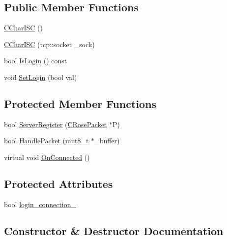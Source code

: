 \subsection*{Public Member Functions}
\begin{DoxyCompactItemize}
\item 
\hyperlink{classCCharISC_ae18a0ff7d066dd5f2d778467e4df78a6}{C\+Char\+I\+SC} ()
\item 
\hyperlink{classCCharISC_a2bfe32cf5c0434bbe4afe3b054c06a97}{C\+Char\+I\+SC} (tcp\+::socket \+\_\+sock)
\item 
bool \hyperlink{classCCharISC_af36d30519afd9ae4d8be42863d1c8160}{Is\+Login} () const 
\item 
void \hyperlink{classCCharISC_a5800f34ef8ddb45225e36806a6aec617}{Set\+Login} (bool val)
\end{DoxyCompactItemize}
\subsection*{Protected Member Functions}
\begin{DoxyCompactItemize}
\item 
bool \hyperlink{classCCharISC_ac6746e044beeedafd54e70758505a1ca}{Server\+Register} (\hyperlink{structCRosePacket}{C\+Rose\+Packet} $\ast$P)
\item 
bool \hyperlink{classCCharISC_a9f039fb39ae52a5794ac1030ea562683}{Handle\+Packet} (\hyperlink{stdint_8h_aba7bc1797add20fe3efdf37ced1182c5}{uint8\+\_\+t} $\ast$\+\_\+buffer)
\item 
virtual void \hyperlink{classCCharISC_ab90f705e4c92b4c7d5f2094b16a0b6d2}{On\+Connected} ()
\end{DoxyCompactItemize}
\subsection*{Protected Attributes}
\begin{DoxyCompactItemize}
\item 
bool \hyperlink{classCCharISC_a0dbfbafebc493e1c0da28bc0cf77eba0}{login\+\_\+connection\+\_\+}
\end{DoxyCompactItemize}


\subsection{Constructor \& Destructor Documentation}
